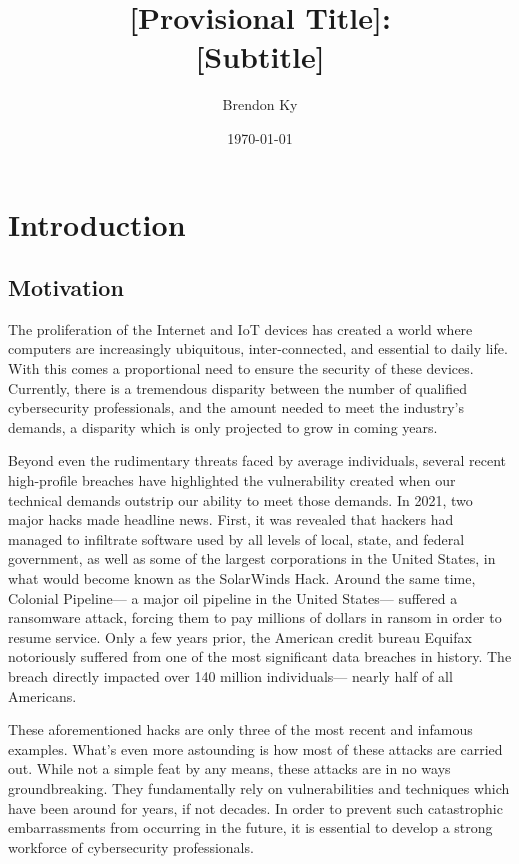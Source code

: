 \documentclass{article}
\title{
    [Provisional Title]: \\
    \large [Subtitle]
}
\author{Brendon Ky}
\date{\today}
\begin{document}
\maketitle

\section{Introduction}

    \subsection{Motivation} 
    The proliferation of the Internet and IoT devices has created a world where computers are increasingly ubiquitous, inter-connected, and essential to daily life. %
With this comes a proportional need to ensure the security of these devices. %
Currently, there is a tremendous disparity between the number of qualified cybersecurity professionals, and the amount needed to meet the industry's demands, a disparity which is only projected to grow in coming years.
    
    Beyond even the rudimentary threats faced by average individuals, several recent high-profile breaches have highlighted the vulnerability created when our technical demands outstrip our ability to meet those demands. %
In 2021, two major hacks made headline news. %
First, it was revealed that hackers had managed to infiltrate software used by all levels of local, state, and federal government, as well as some of the largest corporations in the United States, in what would become known as the SolarWinds Hack.
    Around the same time, Colonial Pipeline---%
a major oil pipeline in the United States---%
suffered a ransomware attack, forcing them to pay millions of dollars in ransom in order to resume service. %
Only a few years prior, the American credit bureau Equifax notoriously suffered from one of the most significant data breaches in history. %
The breach directly impacted over 140 million individuals---%
nearly half of all Americans. 
    
    These aforementioned hacks are only three of the most recent and infamous examples. %
What's even more astounding is how most of these attacks are carried out. %
While not a simple feat by any means, these attacks are in no ways groundbreaking. %
They fundamentally rely on vulnerabilities and techniques which have been around for years, if not decades. %
In order to prevent such catastrophic embarrassments from occurring in the future, it is essential to develop a strong workforce of cybersecurity professionals. 
\end{document}
